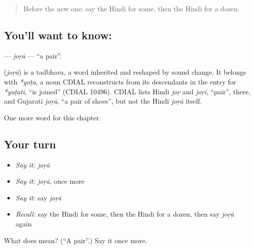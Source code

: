 \label{lesson:HI-C245-jora}



\begin{quote}
Before the new one: say the Hindi for some, then the Hindi for a dozen.
\end{quote}

\subsection*{You'll want to know: }
\textbf{} — \emph{joṛā} — \textquotedblleft{}a pair\textquotedblright{}.

\begin{cousinweb}
\textbf{} (\emph{joṛā}) is a tadbhava, a word inherited and reshaped by sound change. It belongs with \emph{*yoṭa}, a noun CDIAL reconstructs from its descendants in the entry for \emph{*yuṭati}, \textquotedblleft{}is joined\textquotedblright{} (CDIAL 10496). CDIAL lists Hindi \emph{joṛ} and \emph{joṛī}, \textquotedblleft{}pair\textquotedblright{}, there, and Gujarati \emph{joṛā}, \textquotedblleft{}a pair of shoes\textquotedblright{}, but not the Hindi \emph{joṛā} itself.
\end{cousinweb}

\begin{grammarlens}[title={What you've built}]
One more word for this chapter.
\end{grammarlens}

\subsection*{Your turn}
\begin{itemize}
\raggedright
  \item \emph{Say it:} \emph{joṛā}
  \item \emph{Say it:} \emph{joṛā}, once more
  \item \emph{Say it:} say \emph{joṛā}
  \item \emph{Recall:} say the Hindi for some, then the Hindi for a dozen, then say \emph{joṛā} again
\end{itemize}

\begin{tcolorbox}[breakable,colback=teal!4,colframe=teal!35!black,title={Before you move on}]
What does  mean? (\textquotedblleft{}A pair\textquotedblright{}.) Say it once more.
\end{tcolorbox}
